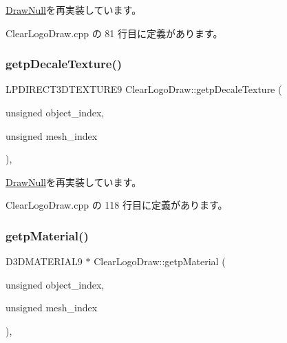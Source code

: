\mbox{\hyperlink{class_draw_null_a7586cc78eed6bcaf2972ad7a6a70e665}{Draw\+Null}}を再実装しています。



 Clear\+Logo\+Draw.\+cpp の 81 行目に定義があります。

\mbox{\label{class_clear_logo_draw_ae67f9779fb2f9aa05d55c2167a36ddb0}} 
\subsubsection{\texorpdfstring{getp\+Decale\+Texture()}{getpDecaleTexture()}}
{\footnotesize\ttfamily L\+P\+D\+I\+R\+E\+C\+T3\+D\+T\+E\+X\+T\+U\+R\+E9 Clear\+Logo\+Draw\+::getp\+Decale\+Texture (\begin{DoxyParamCaption}\item[{unsigned}]{object\+\_\+index,  }\item[{unsigned}]{mesh\+\_\+index }\end{DoxyParamCaption})\hspace{0.3cm}{\ttfamily [override]}, {\ttfamily [virtual]}}



\mbox{\hyperlink{class_draw_null_a2dfa2d2cbb66249f933420a38e9cadad}{Draw\+Null}}を再実装しています。



 Clear\+Logo\+Draw.\+cpp の 118 行目に定義があります。

\mbox{\label{class_clear_logo_draw_a6273330249f20ddcde3a2ab97c1bdca2}} 
\subsubsection{\texorpdfstring{getp\+Material()}{getpMaterial()}}
{\footnotesize\ttfamily D3\+D\+M\+A\+T\+E\+R\+I\+A\+L9 $\ast$ Clear\+Logo\+Draw\+::getp\+Material (\begin{DoxyParamCaption}\item[{unsigned}]{object\+\_\+index,  }\item[{unsigned}]{mesh\+\_\+index }\end{DoxyParamCaption})\hspace{0.3cm}{\ttfamily [override]}, {\ttfamily [virtual]}}




